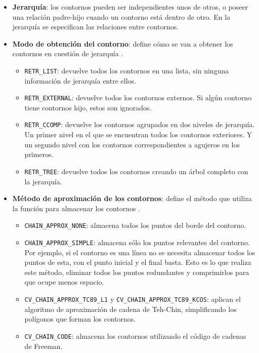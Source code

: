 \begin{itemize}
\tightlist
\item
  \textbf{Jerarquía}: los contornos pueden ser independientes unos de
  otros, o poseer una relación padre-hijo cuando un contorno está dentro
  de otro. En la jerarquía se especifican las relaciones entre
  contornos.
\item
  \textbf{Modo de obtención del contorno}: define cómo se van a obtener
  los contornos en cuestión de jerarquía \citep{opencv:find_contours}.

  \begin{itemize}
  \tightlist
  \item
    \texttt{RETR\_LIST}: devuelve todos los contornos en una lista, sin
    ninguna información de jerarquía entre ellos.
  \item
    \texttt{RETR\_EXTERNAL}: devuelve todos los contornos externos. Si
    algún contorno tiene contornos hijo, estos son ignorados.
  \item
    \texttt{RETR\_CCOMP}: devuelve los contornos agrupados en dos
    niveles de jerarquía. Un primer nivel en el que se encuentran todos
    los contornos exteriores. Y un segundo nivel con los contornos
    correspondientes a agujeros en los primeros.
  \item
    \texttt{RETR\_TREE}: devuelve todos los contornos creando un árbol
    completo con la jerarquía.
  \end{itemize}
\item
  \textbf{Método de aproximación de los contornos}: define el método que
  utiliza la función para almacenar los contornos
  \citep{opencv:find_contours}.

  \begin{itemize}
  \tightlist
  \item
    \texttt{CHAIN\_APPROX\_NONE}: almacena todos los puntos del borde
    del contorno.
  \item
    \texttt{CHAIN\_APPROX\_SIMPLE}: almacena sólo los puntos relevantes
    del contorno. Por ejemplo, si el contorno es una línea no se
    necesita almacenar todos los puntos de esta, con el punto inicial y
    el final basta. Esto es lo que realiza este método, eliminar todos
    los puntos redundantes y comprimirlos para que ocupe menos espacio.
  \item
    \texttt{CV\_CHAIN\_APPROX\_TC89\_L1} y
    \texttt{CV\_CHAIN\_APPROX\_TC89\_KCOS}: aplican el algoritmo de
    aproximación de cadena de Teh-Chin, simplificando los polígonos que
    forman los contornos.
  \item
    \texttt{CV\_CHAIN\_CODE}: almacena los contornos utilizando el
    código de cadenas de Freeman.
  \end{itemize}
\end{itemize}

